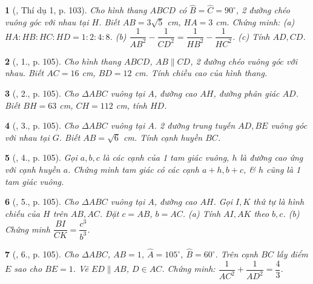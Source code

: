 \documentclass{article}
\newtheorem{baitoan}{}
\begin{document}
\begin{baitoan}[\cite{Tuyen_Toan_9_old}, Thí dụ 1, p. 103]
	Cho hình thang $ABCD$ có $\widehat{B} = \widehat{C} = 90^\circ$, 2 đường chéo vuông góc với nhau tại $H$. Biết $AB = 3\sqrt{5}$ \emph{cm}, $HA = 3$ \emph{cm}. Chứng minh: (a) $HA:HB:HC:HD = 1:2:4:8$. (b) $\dfrac{1}{AB^2} - \dfrac{1}{CD^2} = \dfrac{1}{HB^2} - \dfrac{1}{HC^2}$. (c) Tính $AD,CD$.
\end{baitoan}

\begin{baitoan}[\cite{Tuyen_Toan_9_old}, 1., p. 105]
	Cho hình thang $ABCD$, $AB\parallel CD$, 2 đường chéo vuông góc với nhau. Biết $AC = 16$ \emph{cm}, $BD = 12$ \emph{cm}. Tính chiều cao của hình thang.
\end{baitoan}

\begin{baitoan}[\cite{Tuyen_Toan_9_old}, 2., p. 105]
	Cho $\Delta ABC$ vuông tại $A$, đường cao $AH$, đường phân giác $AD$. Biết $BH = 63$ \emph{cm}, $CH = 112$ \emph{cm}, tính $HD$.
\end{baitoan}

\begin{baitoan}[\cite{Tuyen_Toan_9_old}, 3., p. 105]
	Cho $\Delta ABC$ vuông tại $A$. 2 đường trung tuyến $AD,BE$ vuông góc với nhau tại $G$. Biết $AB = \sqrt{6}$ \emph{cm}. Tính cạnh huyền $BC$.
\end{baitoan}

\begin{baitoan}[\cite{Tuyen_Toan_9_old}, 4., p. 105]
	Gọi $a,b,c$ là các cạnh của 1 tam giác vuông, $h$ là đường cao ứng với cạnh huyền $a$. Chứng minh tam giác có các cạnh $a + h,b + c$, \& $h$ cũng là 1 tam giác vuông.
\end{baitoan}

\begin{baitoan}[\cite{Tuyen_Toan_9_old}, 5., p. 105]
	Cho $\Delta ABC$ vuông tại $A$, đường cao $AH$. Gọi $I,K$ thứ tự là hình chiếu của $H$ trên $AB,AC$. Đặt $c = AB$, $b = AC$. (a) Tính $AI,AK$ theo $b,c$. (b) Chứng minh $\dfrac{BI}{CK} = \dfrac{c^3}{b^3}$.
\end{baitoan}

\begin{baitoan}[\cite{Tuyen_Toan_9_old}, 6., p. 105]
	Cho $\Delta ABC$, $AB = 1$, $\widehat{A} = 105^\circ$, $\widehat{B} = 60^\circ$. Trên cạnh $BC$ lấy điểm $E$ sao cho $BE = 1$. Vẽ $ED\parallel AB$, $D\in AC$. Chứng minh: $\dfrac{1}{AC^2} + \dfrac{1}{AD^2} = \dfrac{4}{3}$.
\end{baitoan}
\end{document}
